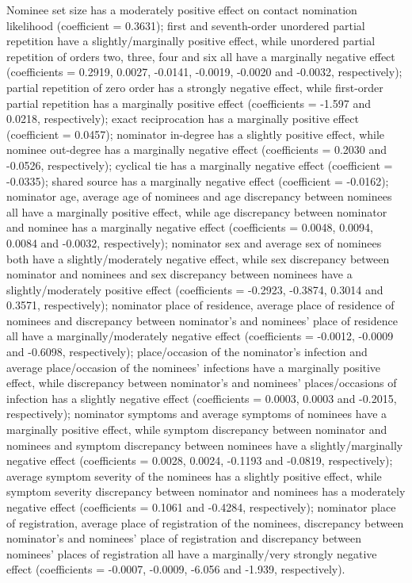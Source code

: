 Nominee set size has a moderately positive effect on contact nomination likelihood (coefficient = 0.3631); first and seventh-order unordered partial repetition have a slightly/marginally positive effect, while unordered partial repetition of orders two, three, four and six all have a marginally negative effect (coefficients = 0.2919, 0.0027, -0.0141, -0.0019, -0.0020 and -0.0032, respectively); partial repetition of zero order has a strongly negative effect, while first-order partial repetition has a marginally positive effect (coefficients = -1.597 and 0.0218, respectively); exact reciprocation has a marginally positive effect (coefficient = 0.0457); nominator in-degree has a slightly positive effect, while nominee out-degree has a marginally negative effect (coefficients = 0.2030 and -0.0526, respectively); cyclical tie has a marginally negative effect (coefficient = -0.0335); shared source has a marginally negative effect (coefficient = -0.0162); nominator age, average age of nominees and age discrepancy between nominees all have a marginally positive effect, while age discrepancy between nominator and nominee has a marginally negative effect (coefficients = 0.0048, 0.0094, 0.0084 and -0.0032, respectively); nominator sex and average sex of nominees both have a slightly/moderately negative effect, while sex discrepancy between nominator and nominees and sex discrepancy between nominees have a slightly/moderately positive effect (coefficients = -0.2923, -0.3874, 0.3014 and 0.3571, respectively); nominator place of residence, average place of residence of nominees and discrepancy between nominator's and nominees' place of residence all have a marginally/moderately negative effect (coefficients = -0.0012, -0.0009 and -0.6098, respectively); place/occasion of the nominator's infection and average place/occasion of the nominees' infections have a marginally positive effect, while discrepancy between nominator's and nominees' places/occasions of infection has a slightly negative effect (coefficients = 0.0003, 0.0003 and -0.2015, respectively); nominator symptoms and average symptoms of nominees have a marginally positive effect, while symptom discrepancy between nominator and nominees and symptom discrepancy between nominees have a slightly/marginally negative effect (coefficients = 0.0028, 0.0024, -0.1193 and -0.0819, respectively); average symptom severity of the nominees has a slightly positive effect, while symptom severity discrepancy between nominator and nominees has a moderately negative effect (coefficients = 0.1061 and -0.4284, respectively); nominator place of registration, average place of registration of the nominees, discrepancy between nominator's and nominees' place of registration and discrepancy between nominees' places of registration all have a marginally/very strongly negative effect (coefficients = -0.0007, -0.0009, -6.056 and -1.939, respectively).


